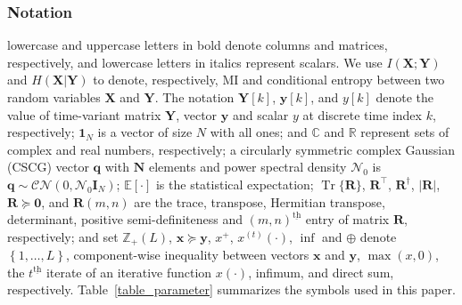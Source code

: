 \documentclass[10pt,journal]{IEEEtran}
\DeclareMathOperator{\trace}{Tr}
\newcommand{\paren}[1]{\left({#1}\right)}
\newcommand{\bracket}[1]{{\left [{#1}\right ]}}
\newcommand{\ith}[1]    {{#1}^{\underline{\text{th}}}}
\theoremstyle{definition}
\begin{document}
	\subsubsection*{Notation} lowercase and uppercase letters in bold denote columns and matrices, respectively, and lowercase letters in italics represent scalars. We use $I(\mathbf{X};\mathbf{Y})$ and $H\paren{\mathbf{X}|\mathbf{Y}}$ to denote, respectively, MI and conditional entropy between two random variables $\mathbf{X}$ and $\mathbf{Y}$. The notation $\mathbf{Y}\bracket{k}$, $\mathbf{y}\bracket{k}$, and $y\bracket{k}$ denote the value of time-variant matrix $\mathbf{Y}$, vector $\mathbf{y}$ and scalar $y$ at discrete time index $k$, respectively; $\mathbf{1}_{\mathit{N}}$ is a vector of size $\mathit{N}$ with all ones; and $\mathbb{C}$ and $\mathbb{R}$ represent sets of complex and real numbers, respectively; a circularly symmetric complex Gaussian (CSCG) vector $\mathbf{q}$ with $\mathbf{N}$ elements and power spectral density $\mathcal{N}_0$ is $\mathbf{q}\sim\mathcal{CN}(0,\mathcal{N}_0\mathbf{I}_{\mathit{N}})$; $\mathbb{E}\bracket{\cdot}$ is the statistical expectation; $\trace\{\mathbf{R}\}$, $\mathbf{R}^\top$, $\mathbf{R}^\dagger$, $\left| \mathbf{R}\right|$, $\mathbf{R}\succeq\mathbf{0}$, and $\mathbf{R}\paren{m,n}$ are the trace, transpose, Hermitian transpose, determinant, positive semi-definiteness and $\ith{\paren{m,n}}$ entry of matrix $\mathbf{R}$, respectively; and set $\mathbb{Z}_{+}(L)$, $\mathbf{x}\succeq\mathbf{y}$, $x^+$, $x^{\paren{t}}\paren{\cdot}$, $\inf$ and $\oplus$ denote $\left\lbrace1,\dots,L\right\rbrace$,  component-wise inequality between vectors $\mathbf{x}$ and $\mathbf{y}$, $\max(x,0)$, the $\ith{t}$ iterate of an iterative function $x\paren{\cdot}$, infimum, and direct sum, respectively. 
	\color{red} Table~\ref{table_parameter} summarizes the symbols used in this paper.
\end{document}
